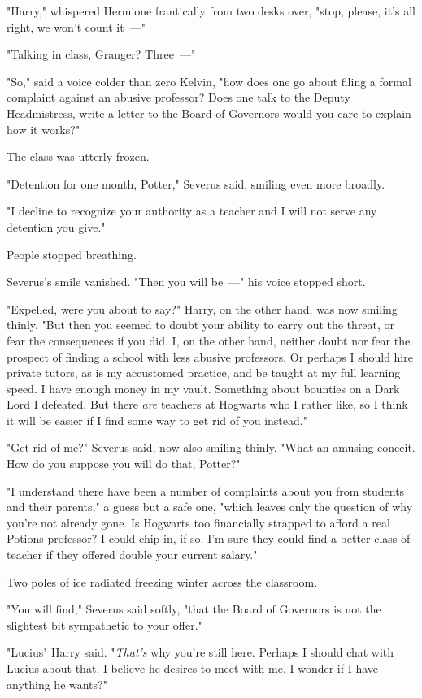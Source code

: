 "Harry," whispered Hermione frantically from two desks over, "stop, please,
it's all right, we won't count it~---"

"Talking in class, Granger? Three~---"

"So," said a voice colder than zero Kelvin, "how does one go about filing a
formal complaint against an abusive professor? Does one talk to the Deputy
Headmistress, write a letter to the Board of Governors{\el} would you care
to explain how it works?"

The class was utterly frozen.

"Detention for one month, Potter," Severus said, smiling even more broadly.

"I decline to recognize your authority as a teacher and I will not serve any
detention you give."

People stopped breathing.

Severus's smile vanished. "Then you will be~---" his voice stopped short.

"Expelled, were you about to say?" Harry, on the other hand, was now smiling
thinly. "But then you seemed to doubt your ability to carry out the threat, or
fear the consequences if you did. I, on the other hand, neither doubt nor fear
the prospect of finding a school with less abusive professors. Or perhaps I
should hire private tutors, as is my accustomed practice, and be taught at my
full learning speed. I have enough money in my vault. Something about bounties
on a Dark Lord I defeated. But there \emph{are} teachers at Hogwarts who I
rather like, so I think it will be easier if I find some way to get rid of you
instead."

"Get rid of me?" Severus said, now also smiling thinly. "What an amusing
conceit. How do you suppose you will do that, Potter?"

"I understand there have been a number of complaints about you from students
and their parents," a guess but a safe one, "which leaves only the question of
why you're not already gone. Is Hogwarts too financially strapped to afford a
real Potions professor? I could chip in, if so. I'm sure they could find a
better class of teacher if they offered double your current salary."

Two poles of ice radiated freezing winter across the classroom.

"You will find," Severus said softly, "that the Board of Governors is not the
slightest bit sympathetic to your offer."

"Lucius{\el}" Harry said. "\emph{That's} why you're still here. Perhaps I
should chat with Lucius about that. I believe he desires to meet with me. I
wonder if I have anything he wants?"

